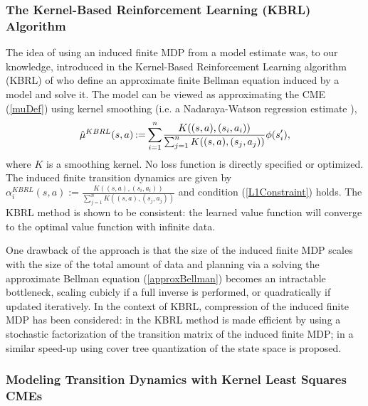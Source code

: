 \documentclass[letterpaper]{article}
\newcommand{\OrmoneitKBRL}{DBLP:journals/ml/OrmoneitS02}
\newcommand{\BarretoStochasticFactorization}{DBLP:conf/nips/BarretoPP11}
\newcommand{\KvetonRepresentativeKBRL}{DBLP:conf/aaai/KvetonT12}
\newcommand{\WatsonNadarayaWatson}{Wats:1964}
\newcommand{\NadarayaNadarayaWatson}{Nada:1964}
\begin{document}
\subsubsection{The Kernel-Based Reinforcement Learning (KBRL) Algorithm}

The idea of using an induced finite MDP from a model estimate was, to our knowledge, introduced in the Kernel-Based Reinforcement Learning algorithm (KBRL) of \cite{\OrmoneitKBRL} who define an approximate finite Bellman equation induced by a model and solve it. The model can be viewed as approximating the CME (\ref{muDef}) using kernel smoothing (i.e. a Nadaraya-Watson regression estimate \citep{\NadarayaNadarayaWatson,\WatsonNadarayaWatson}),
\begin{align}
\hat\mu^{KBRL} (s,a)\hspace{-0.3mm}:= \hspace{-0.3mm}\sum_{i=1}^n\hspace{-0.3mm} \frac{K((s,a),(s_i,a_i))}{\sum_{j=1}^n K((s,a),(s_j,a_j))}\phi(s'_i), \label{KBRLmu}
\end{align}
where $K$ is a smoothing kernel.  No loss function is directly specified or optimized. The induced finite transition dynamics are given by $\alpha^{KBRL}_i(s,a) :=  \frac{K((s,a),(s_i,a_i))}{\sum_{j=1}^n K((s,a),(s_j,a_j))}$ and condition (\ref{L1Constraint}) holds. The KBRL method is shown to be consistent: the learned value function will converge to the optimal value function with infinite data.

One drawback of the approach is that the size of the induced finite MDP scales with the size of the total amount of data and planning via a solving the approximate Bellman equation (\ref{approxBellman})  becomes an intractable bottleneck, scaling cubicly if a full inverse is performed, or quadratically if updated iteratively. In the context of KBRL, compression of the induced finite MDP has been considered: in \cite{\BarretoStochasticFactorization} the KBRL method is made efficient by using a stochastic factorization of the transition matrix of the induced finite MDP; in \cite{\KvetonRepresentativeKBRL} a similar speed-up using cover tree quantization of the state space is proposed.

\subsubsection{Modeling Transition Dynamics with Kernel Least Squares CMEs}
\end{document}
